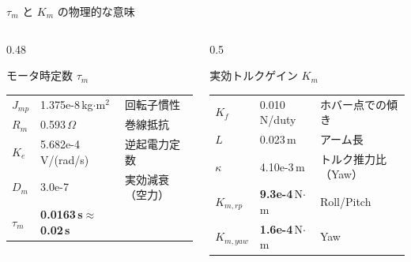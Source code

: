 \begin{frame}{$\tau_m$ と $K_m$ の物理的な意味\later}
  \begin{columns}[t]
    \begin{column}{0.48\textwidth}
      \begin{block}{モータ時定数 $\tau_m$}\footnotesize
        \cardbody{\tauKmCardH}{%
        \vspace{-0.3em}
        \[
          \tau_m = \frac{J_{mp} R_m}{K_e^2 + D_m R_m}
        \]}
      \end{block}
      {\footnotesize
      \begin{tabular}{lll}
        \hline
        $J_{mp}$ & 1.375e-8\,kg$\cdot$m$^2$ & 回転子慣性 \\
        $R_m$    & 0.593\,$\Omega$    & 巻線抵抗 \\
        $K_e$    & 5.682e-4\,V/(rad/s) & 逆起電力定数 \\
        $D_m$    & 3.0e-7 & 実効減衰（空力） \\
        \hline
        $\tau_m$ & \textbf{0.0163\,s}$\approx$\textbf{0.02\,s} & \\
        \hline
      \end{tabular}}
    \end{column}
    \begin{column}{0.5\textwidth}
      \begin{block}{実効トルクゲイン $K_m$}\footnotesize
        \cardbody{\tauKmCardH}{%
        \vspace{-0.3em}
        \[
          K_f=\left.\frac{dF}{dd}\right|_{\!hover}\!\!,\;\;
          K_m=\begin{cases}4L K_f & \text{Roll/Pitch}\\4\kappa K_f & \text{Yaw}\end{cases}
        \]}
      \end{block}
      {\footnotesize
      \begin{tabular}{lll}
        \hline
        $K_f$    & 0.010\,N/duty & ホバー点での傾き \\
        $L$      & 0.023\,m & アーム長 \\
        $\kappa$ & 4.10e-3\,m & トルク推力比（Yaw） \\
        \hline
        $K_{m,rp}$ & \textbf{9.3e-4}\,N$\cdot$m & Roll/Pitch \\
        $K_{m,yaw}$ & \textbf{1.6e-4}\,N$\cdot$m & Yaw \\
        \hline
      \end{tabular}}
    \end{column}
  \end{columns}
\end{frame}

